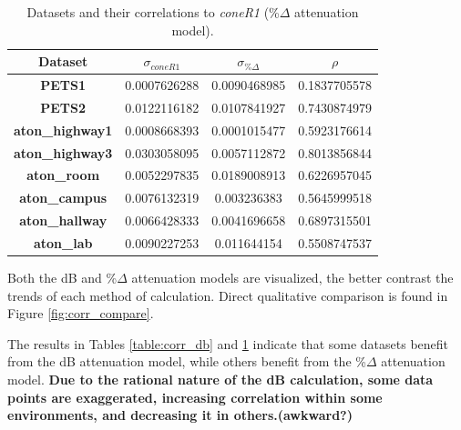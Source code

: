 \documentclass[12pt]{report}
\begin{document}
\begin{table}
\begin{tabular}{ |c|c|c|c| }
	\hline
	\textbf{Dataset} & \textbf{$\sigma_{coneR1}$} & \textbf{$\sigma_{\%\Delta}$} & \textbf{$\rho$} \\
	\hline
	\hline
	\textbf{PETS1} & 0.0007626288 & 0.0090468985 & 0.1837705578 \\
	\hline
	\textbf{PETS2} & 0.0122116182 & 0.0107841927 & 0.7430874979 \\
	\hline
	\textbf{aton\_highway1} & 0.0008668393 & 0.0001015477 & 0.5923176614 \\
	\hline
	\textbf{aton\_highway3} & 0.0303058095 & 0.0057112872 &  0.8013856844 \\
	\hline
	\textbf{aton\_room} & 0.0052297835 & 0.0189008913 &  0.6226957045 \\
	\hline
	\textbf{aton\_campus} & 0.0076132319 & 0.003236383 &  0.5645999518 \\
	\hline
	\textbf{aton\_hallway} & 0.0066428333 & 0.0041696658 &  0.6897315501 \\
	\hline
	\textbf{aton\_lab} & 0.0090227253 & 0.011644154 &  0.5508747537 \\
	\hline
\end{tabular}
\caption{Datasets and their correlations to \textit{coneR1} (\%$\Delta$ attenuation model).}
\label{table:corr_rgb}
\end{table}

Both the dB and \%$\Delta$ attenuation models are visualized, the better contrast the trends of each method of calculation. Direct qualitative comparison is found in Figure \ref{fig:corr_compare}. 

The results in Tables \ref{table:corr_db} and \ref{table:corr_rgb} indicate that some datasets benefit from the dB attenuation model, while others benefit from the \%$\Delta$ attenuation model. \textbf{Due to the rational nature of the dB calculation,  some data points are exaggerated, increasing correlation within some environments, and decreasing it in others.(awkward?)}
\end{document}
